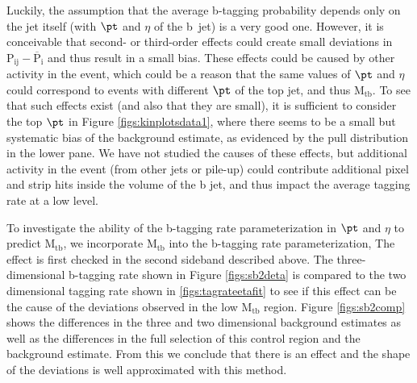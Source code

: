 Luckily, the assumption that the average b-tagging probability
depends only on the jet itself (with $\pt$ and $\eta$ of the b~jet)
is a very good one.  However, it is conceivable that second- or
third-order effects could create small deviations in 
$\mathrm{P_{ij} - \overline P_i}$ and thus result in a small bias.
These effects could be caused by other activity in the event,
which could be a reason that the same values of $\pt$ and $\eta$ 
could correspond to events with different $\pt$ of the top jet,
and thus $\mathrm{M_{tb}}$. To see that such effects exist (and also that
they are small), it is sufficient to consider the top $\pt$ in
Figure \ref{figs:kinplotsdata1}, where there seems to be a small but systematic bias of
the background estimate, as evidenced by the pull distribution
in the lower pane.  We have not studied the causes of these
effects, but additional activity in the event (from other
jets or pile-up) could contribute additional pixel and
strip hits inside the volume of the b jet, and thus impact
the average tagging rate at a low level.

To investigate the ability of the b-tagging rate parameterization in
$\pt$ and $\eta$ to predict $\mathrm{M_{tb}}$, we incorporate $\mathrm{M_{tb}}$ into the
b-tagging rate parameterization,  The effect is first checked in the
second sideband described above.  The three-dimensional b-tagging rate
shown in Figure \ref{figs:sb2deta} is compared to the two dimensional
tagging rate shown in \ref{figs:tagrateetafit} to see if this effect
can be the cause of the deviations observed in the low $\mathrm{M_{tb}}$
region.  Figure \ref{figs:sb2comp} shows the differences in the three
and two dimensional background estimates as well as the differences in
the full selection of this control region and the background estimate.
From this we conclude that there is an effect and the shape of the
deviations is well approximated with this method.


